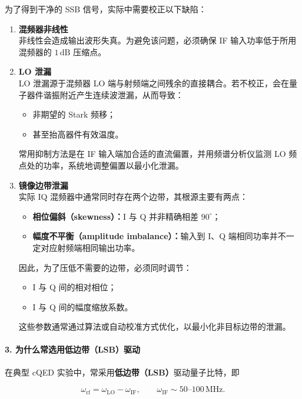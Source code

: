 \documentclass[12pt,a4paper,oneside]{ctexbook}
\begin{document}
为了得到干净的 SSB 信号，实际中需要校正以下缺陷：

\begin{enumerate}
    \item \textbf{混频器非线性} \\
    非线性会造成输出波形失真。为避免该问题，必须确保 IF 输入功率低于所用混频器的 $1\,\mathrm{dB}$ 压缩点。

    \item \textbf{LO 泄漏} \\
    LO 泄漏源于混频器 LO 端与射频端之间残余的直接耦合。若不校正，会在量子器件谐振附近产生连续波泄漏，从而导致：
    \begin{itemize}
        \item 非期望的 Stark 频移；
        \item 甚至抬高器件有效温度。
    \end{itemize}
    常用抑制方法是在 IF 输入端加合适的直流偏置，并用频谱分析仪监测 LO 频点处的功率，系统地调整偏置以最小化泄漏。

    \item \textbf{镜像边带泄漏} \\
    实际 IQ 混频器中通常同时存在两个边带，其根源主要有两点：
    \begin{itemize}
        \item \textbf{相位偏斜（skewness）：}I 与 Q 并非精确相差 $90^\circ$；
        \item \textbf{幅度不平衡（amplitude imbalance）：}输入到 I、Q 端相同功率并不一定对应射频端相同输出功率。
    \end{itemize}
    因此，为了压低不需要的边带，必须同时调节：
    \begin{itemize}
        \item I 与 Q 间的相对相位；
        \item I 与 Q 间的幅度缩放系数。
    \end{itemize}
    这些参数通常通过算法或自动校准方式优化，以最小化非目标边带的泄漏。
\end{enumerate}

\paragraph{3. 为什么常选用低边带（LSB）驱动}

在典型 cQED 实验中，常采用\textbf{低边带（LSB）}驱动量子比特，即

\[
\omega_{\mathrm{rf}} = \omega_{\mathrm{LO}} - \omega_{\mathrm{IF}},
\qquad
\omega_{\mathrm{IF}} \sim 50\text{--}100\,\mathrm{MHz}.
\]
\end{document}
